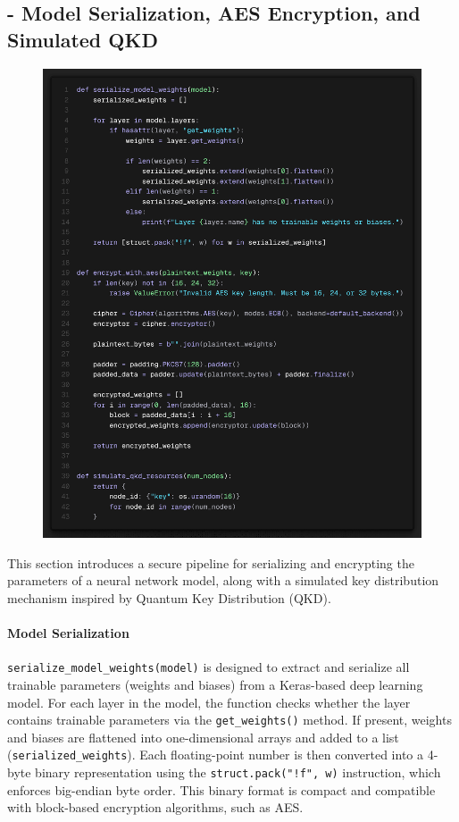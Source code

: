 \documentclass[10pt]{article}
\begin{document}
\subsection*{- Model Serialization, AES Encryption, and Simulated QKD}
\begin{figure}[H]
	\centering
	\includegraphics[height = 0.6\textheight]{img/QFL_code/3.png}
\end{figure}
This section introduces a secure pipeline for serializing and encrypting the parameters of a neural network model, along with a simulated key distribution mechanism inspired by Quantum Key Distribution (QKD).
\paragraph{Model Serialization}
\texttt{serialize\_model\_weights(model)} is designed to extract and serialize all trainable parameters (weights and biases) from a Keras-based deep learning model. For each layer in the model, the function checks whether the layer contains trainable parameters via the \texttt{get\_weights()} method. If present, weights and biases are flattened into one-dimensional arrays and added to a list (\texttt{serialized\_weights}). Each floating-point number is then converted into a 4-byte binary representation using the \texttt{struct.pack("!f", w)} instruction, which enforces big-endian byte order. This binary format is compact and compatible with block-based encryption algorithms, such as AES.
\end{document}
